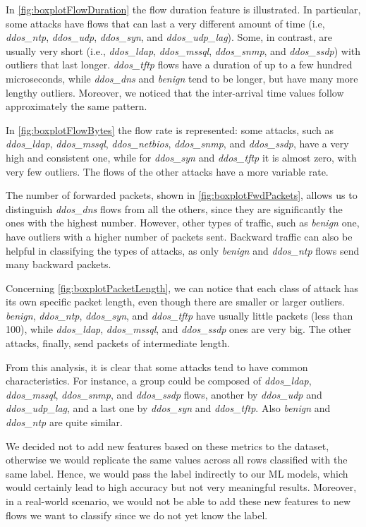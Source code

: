 \documentclass[acmlarge,nonacm]{acmart}
\begin{document}
In \cref{fig:boxplotFlowDuration} the flow duration feature is illustrated. In particular, some attacks have flows that can last a very different amount of time (i.e, \emph{ddos\_ntp}, \emph{ddos\_udp}, \emph{ddos\_syn}, and \emph{ddos\_udp\_lag}). Some, in contrast, are usually very short (i.e., \emph{ddos\_ldap}, \emph{ddos\_mssql}, \emph{ddos\_snmp}, and \emph{ddos\_ssdp}) with outliers that last longer. \emph{ddos\_tftp} flows have a duration of up to a few hundred microseconds, while \emph{ddos\_dns} and \emph{benign} tend to be longer, but have many more lengthy outliers. Moreover, we noticed that the inter-arrival time values follow approximately the same pattern.

In \cref{fig:boxplotFlowBytes} the flow rate is represented: some attacks, such as \emph{ddos\_ldap}, \emph{ddos\_mssql}, \emph{ddos\_netbios}, \emph{ddos\_snmp}, and \emph{ddos\_ssdp}, have a very high and consistent one, while for \emph{ddos\_syn} and \emph{ddos\_tftp} it is almost zero, with very few outliers. The flows of the other attacks have a more variable rate.

The number of forwarded packets, shown in \cref{fig:boxplotFwdPackets}, allows us to distinguish \emph{ddos\_dns} flows from all the others, since they are significantly the ones with the highest number. However, other types of traffic, such as \emph{benign} one, have outliers with a higher number of packets sent. Backward traffic can also be helpful in classifying the types of attacks, as only \emph{benign} and \emph{ddos\_ntp} flows send many backward packets.

Concerning \cref{fig:boxplotPacketLength}, we can notice that each class of attack has its own specific packet length, even though there are smaller or larger outliers. \emph{benign}, \emph{ddos\_ntp}, \emph{ddos\_syn}, and \emph{ddos\_tftp} have usually little packets (less than \SI{100}{\byte}), while \emph{ddos\_ldap}, \emph{ddos\_mssql}, and \emph{ddos\_ssdp} ones are very big. The other attacks, finally, send packets of intermediate length. 

From this analysis, it is clear that some attacks tend to have common characteristics. For instance, a group could be composed of \emph{ddos\_ldap},  \emph{ddos\_mssql}, \emph{ddos\_snmp}, and \emph{ddos\_ssdp} flows, another by \emph{ddos\_udp} and \emph{ddos\_udp\_lag}, and a last one by \emph{ddos\_syn} and \emph{ddos\_tftp}. Also \emph{benign} and \emph{ddos\_ntp} are quite similar. 

We decided not to add new features based on these metrics to the dataset, otherwise we would replicate the same values across all rows classified with the same label. Hence, we would pass the label indirectly to our ML models, which would certainly lead to high accuracy but not very meaningful results. Moreover, in a real-world scenario, we would not be able to add these new features to new flows we want to classify since we do not yet know the label.
\end{document}
